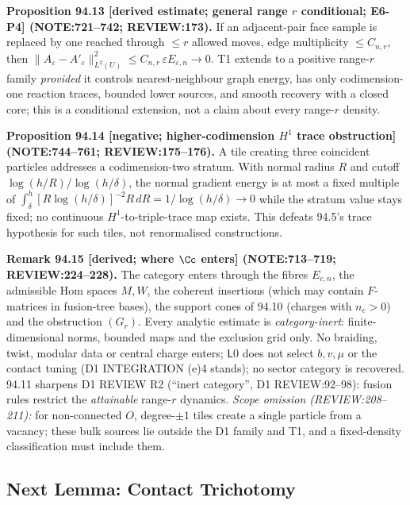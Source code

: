 \textbf{Proposition 94.13 [derived estimate; general range \(r\) conditional; E6-P4] (NOTE:721--742; REVIEW:173).}  If an
adjacent-pair face sample is replaced by one reached through \(\le r\) allowed moves, edge multiplicity \(\le C_{n,r}\), then
\(\|A_\varepsilon-A'_\varepsilon\|^2_{L^2(U)}\le C_{n,r}\,\varepsilon E_{\varepsilon,n}\to0\).  T1 extends to a positive range-\(r\) family \emph{provided} it controls
nearest-neighbour graph energy, has only codimension-one reaction traces, bounded lower sources, and smooth recovery with a
closed core; this is a conditional extension, not a claim about every range-\(r\) density.

\textbf{Proposition 94.14 [negative; higher-codimension \(H^1\) trace obstruction] (NOTE:744--761; REVIEW:175--176).}  A tile
creating three coincident particles addresses a codimension-two stratum.  With normal radius \(R\) and cutoff \(\log(h/R)/\log(h/\delta)\), the normal
gradient energy is at most a fixed multiple of \(\int_\delta^h[R\log(h/\delta)]^{-2}R\,dR=1/\log(h/\delta)\to0\) while the stratum value stays fixed; no continuous
\(H^1\)-to-triple-trace map exists.  This defeats 94.5's trace hypothesis for such tiles, not renormalised constructions.

\textbf{Remark 94.15 [derived; where \(\Cc\) enters] (NOTE:713--719; REVIEW:224--228).}  The category enters through the fibres
\(E_{c,n}\), the admissible Hom spaces \(M,W\), the coherent insertions (which may contain \(F\)-matrices in fusion-tree bases), the
support cones of 94.10 (charges with \(n_c>0\)) and the obstruction \((G_r)\).  Every analytic estimate is \emph{category-inert}:
finite-dimensional norms, bounded maps and the exclusion grid only.  No braiding, twist, modular data or central charge
enters; \(\mathsf L0\) does not select \(b,v,\mu\) or the contact tuning (D1 INTEGRATION (e)4 stands); no sector category is
recovered.  94.11 sharpens D1 REVIEW R2 (``inert category'', D1 REVIEW:92--98): fusion rules restrict the \emph{attainable} range-\(r\)
dynamics.  \emph{Scope omission (REVIEW:208--211):} for non-connected \(O\), degree-\(\pm1\) tiles create a single particle from a
vacancy; these bulk sources lie outside the D1 family and T1, and a fixed-density classification must include them.

\subsection{Next Lemma: Contact Trichotomy}

